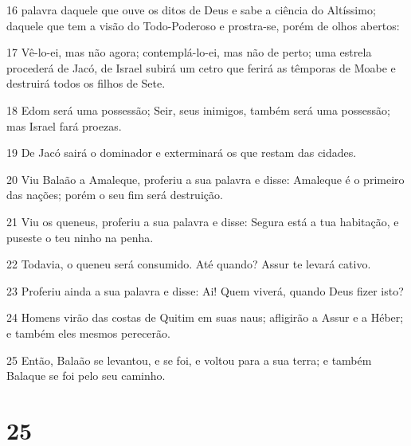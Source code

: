 \par 16 palavra daquele que ouve os ditos de Deus e sabe a ciência do Altíssimo; daquele que tem a visão do Todo-Poderoso e prostra-se, porém de olhos abertos:
\par 17 Vê-lo-ei, mas não agora; contemplá-lo-ei, mas não de perto; uma estrela procederá de Jacó, de Israel subirá um cetro que ferirá as têmporas de Moabe e destruirá todos os filhos de Sete.
\par 18 Edom será uma possessão; Seir, seus inimigos, também será uma possessão; mas Israel fará proezas.
\par 19 De Jacó sairá o dominador e exterminará os que restam das cidades.
\par 20 Viu Balaão a Amaleque, proferiu a sua palavra e disse: Amaleque é o primeiro das nações; porém o seu fim será destruição.
\par 21 Viu os queneus, proferiu a sua palavra e disse: Segura está a tua habitação, e puseste o teu ninho na penha.
\par 22 Todavia, o queneu será consumido. Até quando? Assur te levará cativo.
\par 23 Proferiu ainda a sua palavra e disse: Ai! Quem viverá, quando Deus fizer isto?
\par 24 Homens virão das costas de Quitim em suas naus; afligirão a Assur e a Héber; e também eles mesmos perecerão.
\par 25 Então, Balaão se levantou, e se foi, e voltou para a sua terra; e também Balaque se foi pelo seu caminho.

\chapter{25}

